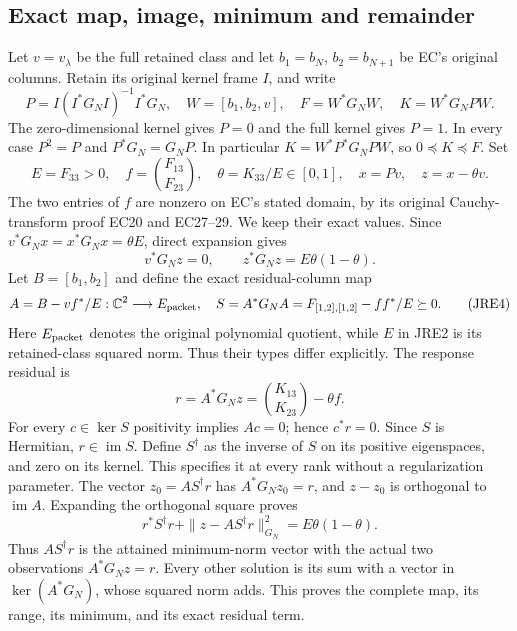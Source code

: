 \subsection{Exact map, image, minimum and remainder}
Let $v=v_\lambda$ be the full retained class and let
$b_1=b_N$, $b_2=b_{N+1}$ be EC's original columns. Retain its original
kernel frame $I$, and write
\[
 P=I(I^*G_NI)^{-1}I^*G_N,\quad
 W=[b_1,b_2,v],\quad F=W^*G_NW,\quad K=W^*G_NPW .                 \tag{JRE1}
\]
The zero-dimensional kernel gives $P=0$ and the full kernel gives $P=1$.
In every case $P^2=P$ and $P^*G_N=G_NP$. In particular
$K=W^*P^*G_NPW$, so $0\preceq K\preceq F$.
Set
\[
 E=F_{33}>0,\quad f=\binom{F_{13}}{F_{23}},\quad
 \theta=K_{33}/E\in[0,1],\quad
 x=Pv,\quad z=x-\theta v .                                    \tag{JRE2}
\]
The two entries of $f$ are nonzero on EC's stated domain, by its original
Cauchy-transform proof EC20 and EC27--29. We keep their exact values.
Since $v^*G_Nx=x^*G_Nx=\theta E$, direct expansion gives
\[
 v^*G_Nz=0,\qquad z^*G_Nz=E\theta(1-\theta).                   \tag{JRE3}
\]
Let $B=[b_1,b_2]$ and define the exact residual-column map
\[
 A=B-vf^*/E:\mathbb C^2\longrightarrow E_{\rm packet},\quad
 S=A^*G_NA=F_{[1,2],[1,2]}-ff^*/E\succeq0 .                    \tag{JRE4}
\]
Here $E_{\rm packet}$ denotes the original polynomial quotient, while
$E$ in JRE2 is its retained-class squared norm. Thus their types differ
explicitly. The response residual is
\[
 r=A^*G_Nz=\binom{K_{13}}{K_{23}}-\theta f .                    \tag{JRE5}
\]
For every $c\in\ker S$ positivity implies $Ac=0$; hence $c^*r=0$.
Since $S$ is Hermitian, $r\in\operatorname{im}S$.
Define $S^\dagger$ as the inverse of $S$ on its positive eigenspaces,
and zero on its kernel. This specifies it at every rank without a
regularization parameter. The vector
$z_0=AS^\dagger r$ has $A^*G_Nz_0=r$, and $z-z_0$ is orthogonal to
$\operatorname{im}A$. Expanding the orthogonal square proves
\[
 \boxed{r^*S^\dagger r+
       \|z-AS^\dagger r\|_{G_N}^{2}=E\theta(1-\theta).}       \tag{JRE6}
\]
Thus $AS^\dagger r$ is the attained minimum-norm vector with the actual
two observations $A^*G_Nz=r$. Every other solution is its sum with a
vector in $\ker(A^*G_N)$, whose squared norm adds. This proves the
complete map, its range, its minimum, and its exact residual term.

